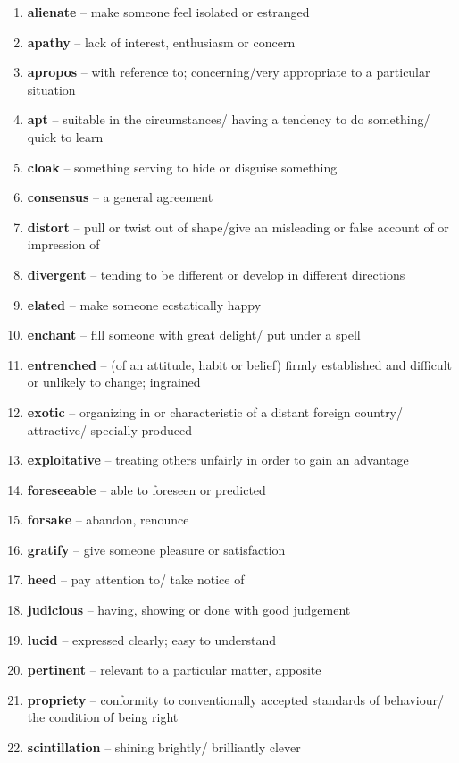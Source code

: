 \begin{enumerate}[wide,labelindent=0pt]
\item \textbf{alienate} -- make someone feel isolated or estranged
\item \textbf{apathy} -- lack of interest, enthusiasm or concern
\item \textbf{apropos} -- with reference to; concerning/very appropriate to a particular situation
\item \textbf{apt} -- suitable in the circumstances/ having a tendency to do something/ quick to learn
\item \textbf{cloak} -- something serving to hide or disguise something
\item \textbf{consensus} -- a general agreement
\item \textbf{distort} -- pull or twist out of shape/give an misleading or false account of or impression of
\item \textbf{divergent} -- tending to be different or develop in different directions
\item \textbf{elated} -- make someone ecstatically happy
\item \textbf{enchant} -- fill someone with great delight/ put under a spell
\item \textbf{entrenched} -- (of an attitude, habit or belief) firmly established and difficult or unlikely to change; ingrained
\item \textbf{exotic} -- organizing in or characteristic of a distant foreign country/ attractive/ specially produced
\item \textbf{exploitative} -- treating others unfairly in order to gain an advantage
\item \textbf{foreseeable} -- able to foreseen or predicted
\item \textbf{forsake} -- abandon, renounce
\item \textbf{gratify} -- give someone pleasure or satisfaction
\item \textbf{heed} -- pay attention to/ take notice of
\item \textbf{judicious} -- having, showing or done with good judgement
\item \textbf{lucid} -- expressed clearly; easy to understand
\item \textbf{pertinent} -- relevant to a particular matter, apposite
\item \textbf{propriety} -- conformity to conventionally accepted standards of behaviour/ the condition of being right
\item \textbf{scintillation} -- shining brightly/ brilliantly clever

\end{enumerate}
